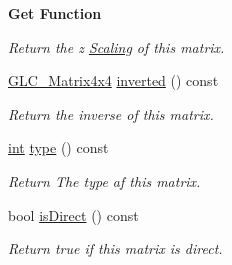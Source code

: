 \begin{Indent}{\bf Get Function}
\begin{DoxyCompactItemize}
\begin{DoxyCompactList}\small\item\em Return the z \hyperlink{class_scaling}{Scaling} of this matrix. \end{DoxyCompactList}\item 
\hyperlink{class_g_l_c___matrix4x4}{G\-L\-C\-\_\-\-Matrix4x4} \hyperlink{class_g_l_c___matrix4x4_a4df9940e11827e52587a4fe87ff2796b}{inverted} () const 
\begin{DoxyCompactList}\small\item\em Return the inverse of this matrix. \end{DoxyCompactList}\item 
\hyperlink{ioapi_8h_a787fa3cf048117ba7123753c1e74fcd6}{int} \hyperlink{class_g_l_c___matrix4x4_a56f9f83d2b202bbe56d534f6d00fc337}{type} () const 
\begin{DoxyCompactList}\small\item\em Return The type af this matrix. \end{DoxyCompactList}\item 
bool \hyperlink{class_g_l_c___matrix4x4_afc72728b0765b1229fd5775d06be9c07}{is\-Direct} () const 
\begin{DoxyCompactList}\small\item\em Return true if this matrix is direct. \end{DoxyCompactList}\end{DoxyCompactItemize}
\end{Indent}
